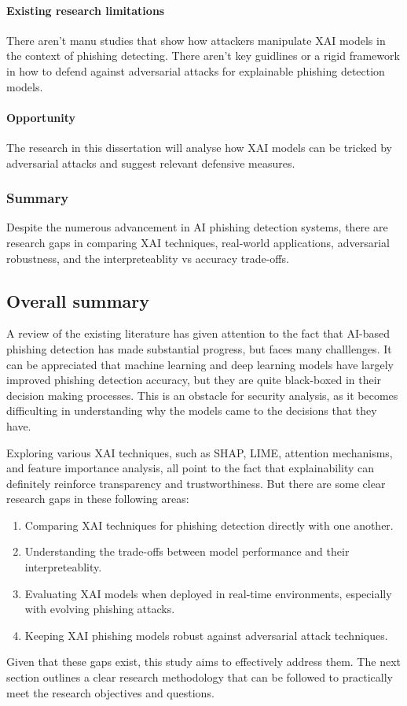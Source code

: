 \paragraph{Existing research limitations}
There aren't manu studies that show how attackers manipulate XAI models in the context of phishing detecting. There aren't key guidlines or a rigid framework in how to defend against adversarial attacks for explainable phishing detection models.

\paragraph{Opportunity}
The research in this dissertation will analyse how XAI models can be tricked by adversarial attacks and suggest relevant defensive measures.

\subsubsection*{Summary}
Despite the numerous advancement in AI phishing detection systems, there are research gaps in comparing XAI techniques, real-world applications, adversarial robustness, and the interpreteablity vs accuracy trade-offs.

\newpage

\subsection*{Overall summary}
A review of the existing literature has given attention to the fact that AI-based phishing detection has made substantial progress, but faces many challlenges. It can be appreciated that machine learning and deep learning models have largely improved phishing detection accuracy, but they are quite black-boxed in their decision making processes. This is an obstacle for security analysis, as it becomes difficulting in understanding why the models came to the decisions that they have.\newline

\noindent Exploring various XAI techniques, such as SHAP, LIME, attention mechanisms, and feature importance analysis, all point to the fact that explainability can definitely reinforce transparency and trustworthiness. But there are some clear research gaps in these following areas:

\begin{enumerate}
  \item Comparing XAI techniques for phishing detection directly with one another.
  \item Understanding the trade-offs between model performance and their interpreteablity.
  \item Evaluating XAI models when deployed in real-time environments, especially with evolving phishing attacks.
  \item Keeping XAI phishing models robust against adversarial attack techniques.
\end{enumerate}

\noindent Given that these gaps exist, this study aims to effectively address them. The next section outlines a clear research methodology that can be followed to practically meet the research objectives and questions.


